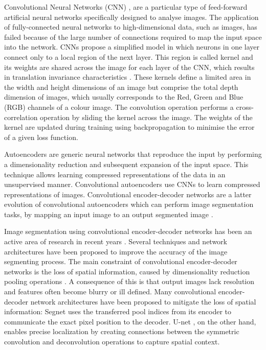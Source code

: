 \documentclass[twocol]{ametsoc}
\begin{document}
Convolutional Neural Networks (CNN) \citep{lecun2010convolutional}, are a particular type of feed-forward artificial neural networks specifically designed to analyse images. The application of fully-connected neural networks to high-dimensional data, such as images, has failed because of the large number of connections required to map the input space into the network. CNNs propose a simplified model in which neurons in one layer connect only to a local region of the next layer. This region is called kernel and its weights are shared across the image for each layer of the CNN, which results in translation invariance characteristics \citep{scherer2010evaluation}. These kernels define a limited area in the width and height dimensions of an image but comprise the total depth dimension of images, which usually corresponds to the Red, Green and Blue (RGB) channels of a colour image. The convolution operation performs a cross-correlation operation by sliding the kernel across the image. The weights of the kernel are updated during training using backpropagation \citep{widrow199030} to minimise the error of a given loss function. 

Autoencoders \citep{hinton2006reducing} are generic neural networks that reproduce the input by performing a dimensionality reduction and subsequent expansion of the input space. This technique allows learning compressed representations of the data in an unsupervised manner. Convolutional autoencoders \citep{masci2011stacked} use CNNs to learn compressed representations of images. Convolutional encoder-decoder networks are a latter evolution of convolutional autoencoders which can perform image segmentation tasks, by mapping an input image to an output segmented image \citep{long2015fully}.

Image segmentation using convolutional encoder-decoder networks has been an active area of research in recent years \citep{krizhevsky2012imagenet,chen2018deeplab}. Several techniques and network architectures have been proposed to improve the accuracy of the image segmenting process. The main constraint of convolutional encoder-decoder networks is the loss of spatial information, caused by dimensionality reduction pooling operations \citep{scherer2010evaluation}. A consequence of this is that output images lack resolution and features often become blurry or ill defined. Many convolutional encoder-decoder network architectures have been proposed to mitigate the loss of spatial information: Segnet \citep{badrinarayanan2017segnet} uses the transferred pool indices from its encoder to communicate the exact pixel position to the decoder. U-net \citep{ronneberger2015u}, on the other hand, enables precise localization by creating connections between the symmetric convolution and deconvolution operations to capture spatial context. 
\end{document}
